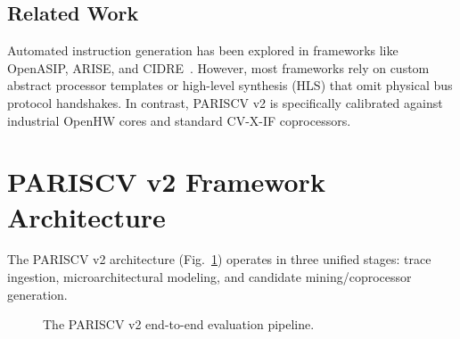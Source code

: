 \documentclass[conference]{IEEEtran}
\begin{document}
\subsection{Related Work}
Automated instruction generation has been explored in frameworks like OpenASIP, ARISE, and CIDRE~\cite{cidre2025}. However, most frameworks rely on custom abstract processor templates or high-level synthesis (HLS) that omit physical bus protocol handshakes. In contrast, PARISCV v2 is specifically calibrated against industrial OpenHW cores and standard CV-X-IF coprocessors.

\section{PARISCV v2 Framework Architecture}

The PARISCV v2 architecture (Fig.~\ref{fig:framework_arch}) operates in three unified stages: trace ingestion, microarchitectural modeling, and candidate mining/coprocessor generation.

\begin{figure}[t]
\centering
{}
\vspace{-3pt}
\caption{The PARISCV v2 end-to-end evaluation pipeline.}
\label{fig:framework_arch}
\vspace{-6pt}
\end{figure}
\end{document}
